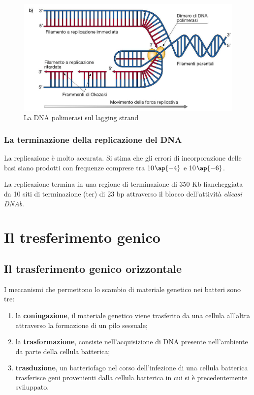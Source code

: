 \documentclass[11pt]{book}
\begin{document}
\begin{figure}[htp]
\centering
\includegraphics[scale=0.2]{img/Lagging strand.png}
\caption{La DNA polimerasi sul lagging strand}
\label{}
\end{figure}

\subsection{La terminazione della replicazione del DNA}
La replicazione è molto accurata. Si stima che gli errori di incorporazione delle basi siano prodotti con frequenze comprese tra 10$\ap{-4}$ e 10$\ap{-6}$.
 
La replicazione termina in una regione di terminazione di 350 Kb fiancheggiata da 10 siti di terminazione (ter) di 23 bp attraverso il blocco dell’attività \emph{elicasi DNAb}.

\chapter{Il tresferimento genico}
\section{Il trasferimento genico orizzontale}

I meccanismi che permettono lo scambio di materiale genetico nei batteri sono tre:
\begin{enumerate}
\item la \textbf{coniugazione}, il materiale genetico viene trasferito da una cellula all’altra attraverso la formazione di un pilo sessuale;
\item la \textbf{trasformazione}, consiste nell'acquisizione di DNA presente nell'ambiente da parte della cellula batterica;
\item \textbf{trasduzione}, un batteriofago nel corso dell’infezione di una cellula batterica trasferisce geni provenienti dalla cellula batterica in cui si è precedentemente sviluppato.
\end{enumerate}
\end{document}
